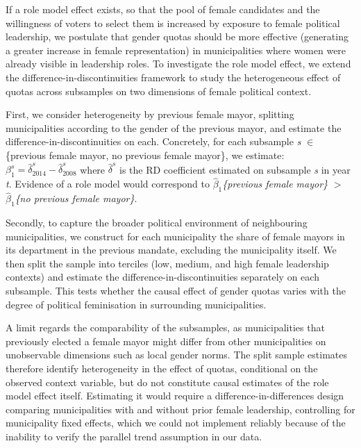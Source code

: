 \documentclass[11pt,a4paper]{article}
\makeatletter
\renewcommand{\subsection}[1]{\@startsection{subsection}{2}{0pt}{1em}{0.4em}{\normalfont\itshape}{\underline{#1}}}
\makeatother
\begin{document}
If a role model effect exists, so that the pool of female candidates and the willingness of voters to select them is increased by exposure to female political leadership, we postulate that gender quotas should be more effective (generating a greater increase in female representation) in municipalities where women were already visible in leadership roles. To investigate the role model effect, we extend the difference-in-discontinuities framework to study the heterogeneous effect of quotas across subsamples on two dimensions of female political context.

First, we consider heterogeneity by previous female mayor, splitting municipalities according to the gender of the previous mayor, and estimate the difference-in-discontinuities on each. Concretely, for each subsample \textit{s} $\in$ \{previous female mayor, no previous female mayor\}, we estimate: $\beta_{1}^{s} = \hat{\delta}_{2014}^{s} - \hat{\delta}_{2008}^{s}$ where $\hat{\delta}^{s}$ is the RD coefficient estimated on subsample \textit{s} in year \textit{t}. Evidence of a role model would correspond to $\hat{\beta}_{1}$\textit{\{previous female mayor\}} $>$ $\hat{\beta}_{1}$\textit{\{no previous female mayor\}}.

Secondly, to capture the broader political environment of neighbouring municipalities, we construct for each municipality the share of female mayors in its department in the previous mandate, excluding the municipality itself. We then split the sample into terciles (low, medium, and high female leadership contexts) and estimate the difference-in-discontinuities separately on each subsample. This tests whether the causal effect of gender quotas varies with the degree of political feminisation in surrounding municipalities.

A limit regards the comparability of the subsamples, as municipalities that previously elected a female mayor might differ from other municipalities on unobservable dimensions such as local gender norms. The split sample estimates therefore identify heterogeneity in the effect of quotas, conditional on the observed context variable, but do not constitute causal estimates of the role model effect itself. Estimating it would require a difference-in-differences design comparing municipalities with and without prior female leadership, controlling for municipality fixed effects, which we could not implement reliably because of the inability to verify the parallel trend assumption in our data.

\subsection{Robustness}
\end{document}
